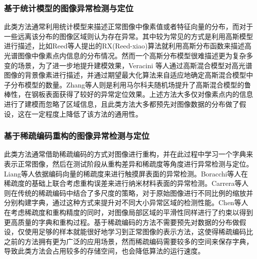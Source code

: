\documentclass[lang=chs, degree=master, blindreview=false, adobe=false]{yanputhesis}
\begin{document}
\subsubsection{基于统计模型的图像异常检测与定位}
此类方法通常利用统计模型来描述正常图像中像素值或者特征向量的分布，而对于一些远离该分布的图像区域则认为存在异常。其中较为常见的方式是利用高斯模型进行描述，比如Reed等人\cite{reed1990adaptive}提出的RX(Reed-xiao)算法就利用高斯分布函数来描述高光谱图像中像素点内信息的分布情况\cite{du2010random}。然而一个高斯分布模型很难描述更为复杂多变的场景，为了进一步地提升建模效果，Veracini 等人\cite{veracini2009fully}通过高斯混合模型对高光谱图像的背景像素进行描述，并通过期望最大化算法来自适应地确定高斯混合模型中子分布模型的数量。Zhang等人\cite{zhang2018automatic}则是利用马尔科夫随机场提升了高斯混合模型的鲁棒性，在钢板表面获得了较好的异常定位效果。上述方法大多仅对像素点内的信息进行了建模而忽略了区域信息，且此类方法大多都预先对图像数据的分布做了假设，这在一定程度上降低了该方法的通用性。

\subsubsection{基于稀疏编码重构的图像异常检测与定位}
此类方法通常借助稀疏编码的方式对图像进行重构，并在此过程中学习一个字典来表示正常图像，然后在测试阶段从重构差异和稀疏度等角度进行异常检测与定位。Liang等人\cite{liang2016touch}依据编码向量的稀疏度来进行触摸屏表面的异常检测。Boracchi等人\cite{carrera2016defect}在稀疏度的基础上联合考虑重构误差来进行纳米材料表面的异常检测。Carrera等人\cite{carrera2016scale}则在传统的稀疏编码中结合了多尺度的策略，对于原始图像进行不同比例的缩放并分别构建字典，通过这种方式来提升对不同大小异常区域的检测性能。Chen等人\cite{chen2011sparse}在考虑稀疏度和重构精度的同时，对图像局部区域的平滑性同样进行了约束以得到更高质量的字典和重构过程。基于稀疏编码的方法不需要预先对数据的分布做假设，仅使用足够的样本就能很好地学习到正常图像的表示方法，这使得稀疏编码比之前的方法拥有更为广泛的应用场景，然而稀疏编码需要较多的空间来保存字典，导致此类方法会占用较多的存储空间，也会降低算法的运行速度。
\end{document}
